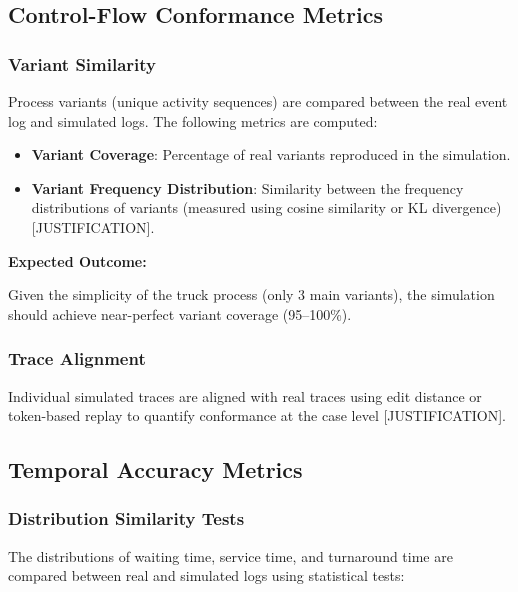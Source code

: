     \subsection{Control-Flow Conformance Metrics}

        \subsubsection{Variant Similarity}
        
        Process variants (unique activity sequences) are compared between the real event log and simulated logs. The following metrics are computed:
        
        \begin{itemize}
            \item \textbf{Variant Coverage}: Percentage of real variants reproduced in the simulation.
            \item \textbf{Variant Frequency Distribution}: Similarity between the frequency distributions of variants (measured using cosine similarity or KL divergence) [JUSTIFICATION].
        \end{itemize}
        
        \textbf{Expected Outcome:}
        
        Given the simplicity of the truck process (only 3 main variants), the simulation should achieve near-perfect variant coverage (95--100\%).

        \subsubsection{Trace Alignment}
        
        Individual simulated traces are aligned with real traces using edit distance or token-based replay to quantify conformance at the case level [JUSTIFICATION].

    \subsection{Temporal Accuracy Metrics}

        \subsubsection{Distribution Similarity Tests}
        
        The distributions of waiting time, service time, and turnaround time are compared between real and simulated logs using statistical tests:
        
